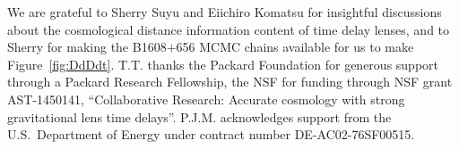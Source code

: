 %
%


\begin{acknowledgements}
We are grateful to Sherry Suyu and Eiichiro Komatsu for insightful
discussions about the cosmological distance information content
of time delay lenses, and to Sherry for making the B1608$+$656 MCMC
chains available for us to make Figure~\ref{fig:DdDdt}.
%
T.T. thanks the Packard Foundation for generous support through a
Packard Research Fellowship, the NSF for funding through NSF grant
AST-1450141, ``Collaborative Research: Accurate cosmology with strong
gravitational lens time delays''.
%
P.J.M. acknowledges support from the U.S.\ Department of Energy under
contract number DE-AC02-76SF00515.
\end{acknowledgements}



